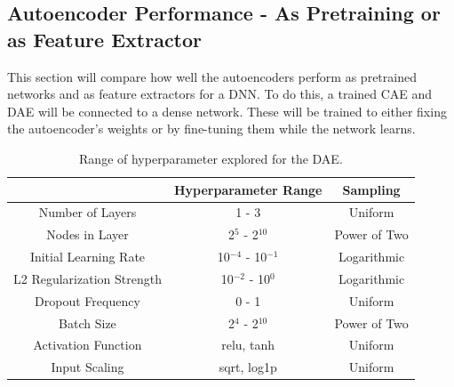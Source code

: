 \subsection{Autoencoder Performance - As Pretraining or as Feature Extractor}

This section will compare how well the autoencoders perform as pretrained networks and as feature extractors for a DNN. To do this, a trained CAE and DAE will be connected to a dense network. These will be trained to either fixing the autoencoder's weights or by fine-tuning them while the network learns.


\begin{table}[H]
\centering
\caption{Range of hyperparameter explored for the DAE.}
\label{table:hyperparameter_dataset_parameters_DAE}
\begin{tabular}{c|c|c|}
\cline{2-3}
 & Hyperparameter Range & Sampling \\ \hline
\multicolumn{1}{|c|}{Number of Layers} & 1 - 3 & Uniform \\ \hline
\multicolumn{1}{|c|}{Nodes in Layer} & 2$^{5}$ - 2$^{10}$ & Power of Two \\ \hline
\multicolumn{1}{|c|}{Initial Learning Rate} & 10$^{-4}$ - 10$^{-1}$ & Logarithmic \\ \hline
\multicolumn{1}{|c|}{L2 Regularization Strength} & 10$^{-2}$ - 10$^{0}$ & Logarithmic \\ \hline
\multicolumn{1}{|c|}{Dropout Frequency} & 0 - 1 & Uniform \\ \hline
\multicolumn{1}{|c|}{Batch Size} & 2$^{4}$ - 2$^{10}$ & Power of Two \\ \hline
\multicolumn{1}{|c|}{Activation Function} & relu, tanh & Uniform \\ \hline
\multicolumn{1}{|c|}{Input Scaling} & sqrt, log1p & Uniform \\ \hline
\end{tabular}
\end{table}











